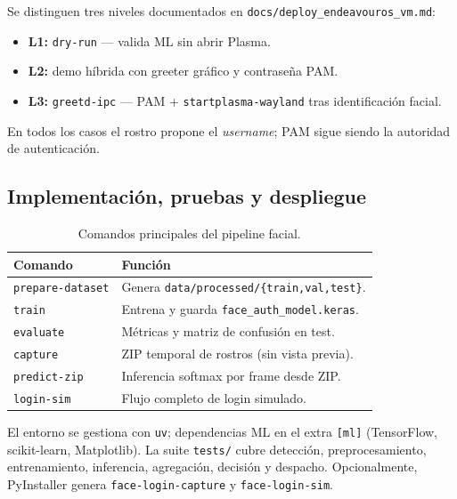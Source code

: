 Se distinguen tres niveles documentados en \texttt{docs/deploy\_endeavouros\_vm.md}:

\begin{itemize}
  \item \textbf{L1:} \texttt{dry-run} --- valida ML sin abrir Plasma.
  \item \textbf{L2:} demo híbrida con greeter gráfico y contraseña PAM.
  \item \textbf{L3:} \texttt{greetd-ipc} --- PAM + \texttt{startplasma-wayland}
        tras identificación facial.
\end{itemize}

En todos los casos el rostro propone el \textit{username}; PAM sigue siendo la
autoridad de autenticación.

\subsection{Implementación, pruebas y despliegue}
\label{subsec:implementacion}

\begin{table}[htbp]
  \centering
  \caption{Comandos principales del pipeline facial.}
  \label{tab:comandos}
  \begin{tabular}{@{}l p{7.8cm}@{}}
    \toprule
    \textbf{Comando} & \textbf{Función} \\
    \midrule
    \texttt{prepare-dataset} & Genera \texttt{data/processed/\{train,val,test\}}. \\
    \texttt{train}           & Entrena y guarda \texttt{face\_auth\_model.keras}. \\
    \texttt{evaluate}        & Métricas y matriz de confusión en test. \\
    \texttt{capture}         & ZIP temporal de rostros (sin vista previa). \\
    \texttt{predict-zip}     & Inferencia softmax por frame desde ZIP. \\
    \texttt{login-sim}       & Flujo completo de login simulado. \\
    \bottomrule
  \end{tabular}
\end{table}

El entorno se gestiona con \texttt{uv}; dependencias ML en el extra \texttt{[ml]}
(TensorFlow, scikit-learn, Matplotlib). La suite \texttt{tests/} cubre detección,
preprocesamiento, entrenamiento, inferencia, agregación, decisión y despacho.
Opcionalmente, PyInstaller genera \texttt{face-login-capture} y
\texttt{face-login-sim}.

